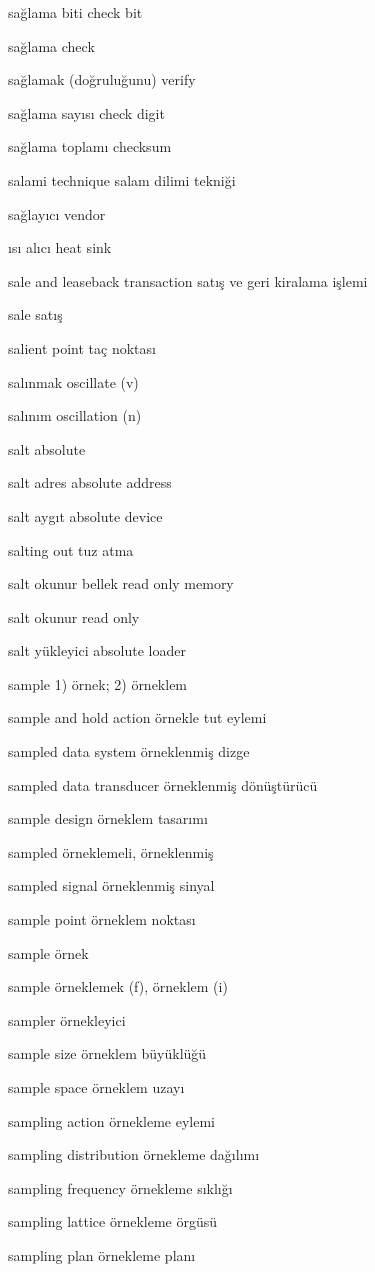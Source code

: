 \documentclass[12pt,fleqn]{article}\usepackage{../../common}
\begin{document}
sağlama biti check bit

sağlama check

sağlamak (doğruluğunu) verify

sağlama sayısı check digit

sağlama toplamı checksum

salami technique salam dilimi tekniği

sağlayıcı vendor

ısı alıcı heat sink

sale and leaseback transaction satış ve geri kiralama işlemi

sale satış

salient point taç noktası

salınmak oscillate (v)

salınım oscillation (n)

salt absolute

salt adres absolute address

salt aygıt absolute device

salting out tuz atma

salt okunur bellek read only memory

salt okunur read only

salt yükleyici absolute loader

sample 1) örnek; 2) örneklem

sample and hold action örnekle tut eylemi

sampled data system örneklenmiş dizge

sampled data transducer örneklenmiş dönüştürücü

sample design örneklem tasarımı

sampled örneklemeli, örneklenmiş

sampled signal örneklenmiş sinyal

sample point örneklem noktası

sample örnek

sample örneklemek (f), örneklem (i)

sampler örnekleyici

sample size örneklem büyüklüğü

sample space örneklem uzayı

sampling action örnekleme eylemi

sampling distribution örnekleme dağılımı

sampling frequency örnekleme sıklığı

sampling lattice örnekleme örgüsü

sampling plan örnekleme planı
\end{document}
